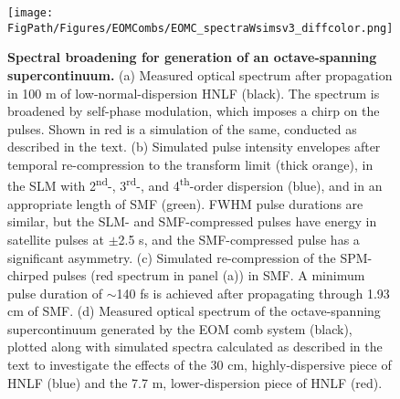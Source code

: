 


\begin{figure}[htpb]
	\begin{center}
		\texttt{[image: \\FigPath/Figures/EOMCombs/EOMC\_spectraWsimsv3\_diffcolor.png]}
	\end{center}
	\caption[Spectral broadening for generation of an octave-spanning supercontinuum]{\textbf{Spectral broadening for generation of an octave-spanning supercontinuum.} (a) Measured optical spectrum after propagation in 100 m of low-normal-dispersion HNLF (black). The spectrum is broadened by self-phase modulation, which imposes a chirp on the pulses. Shown in red is a simulation of the same, conducted as described in the text. (b) Simulated pulse intensity envelopes after temporal re-compression to the transform limit (thick orange), in the SLM with 2\textsuperscript{nd}-, 3\textsuperscript{rd}-, and 4\textsuperscript{th}-order dispersion (blue), and in an appropriate length of SMF (green). FWHM pulse durations are similar, but the SLM- and SMF-compressed pulses have energy in satellite pulses at $\pm$2.5 s, and the SMF-compressed pulse has a significant asymmetry. (c) Simulated re-compression of the SPM-chirped pulses (red spectrum in panel (a)) in SMF. A minimum pulse duration of $\sim$140 fs is achieved after propagating through 1.93 cm of SMF. (d) Measured optical spectrum of the octave-spanning supercontinuum generated by the EOM comb system (black), plotted along with simulated spectra calculated as described in the text to investigate the effects of the 30 cm, highly-dispersive piece of HNLF (blue) and the 7.7 m, lower-dispersion piece of HNLF (red).}
	\label{fig:EOMC_Broadening}
\end{figure} 

